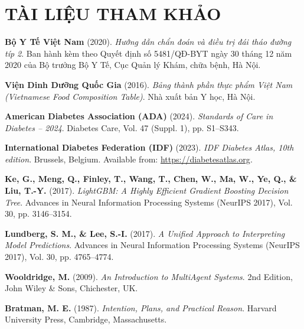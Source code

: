 \documentclass[12pt,a4paper]{article}
\begin{document}
\section*{TÀI LIỆU THAM KHẢO}

\begin{enumerate}[label={[\arabic*]}, leftmargin=1.2cm, itemsep=4pt]
    \item \textbf{Bộ Y Tế Việt Nam} (2020). \textit{Hướng dẫn chẩn đoán và điều trị đái tháo đường típ 2}. Ban hành kèm theo Quyết định số 5481/QĐ-BYT ngày 30 tháng 12 năm 2020 của Bộ trưởng Bộ Y Tế, Cục Quản lý Khám, chữa bệnh, Hà Nội.
    
    \item \textbf{Viện Dinh Dưỡng Quốc Gia} (2016). \textit{Bảng thành phần thực phẩm Việt Nam (Vietnamese Food Composition Table)}. Nhà xuất bản Y học, Hà Nội.
    
    \item \textbf{American Diabetes Association (ADA)} (2024). \textit{Standards of Care in Diabetes -- 2024}. Diabetes Care, Vol. 47 (Suppl. 1), pp. S1--S343.
    
    \item \textbf{International Diabetes Federation (IDF)} (2023). \textit{IDF Diabetes Atlas, 10th edition}. Brussels, Belgium. Available from: \url{https://diabetesatlas.org}.
    
    \item \textbf{Ke, G., Meng, Q., Finley, T., Wang, T., Chen, W., Ma, W., Ye, Q., \& Liu, T.-Y.} (2017). \textit{LightGBM: A Highly Efficient Gradient Boosting Decision Tree}. Advances in Neural Information Processing Systems (NeurIPS 2017), Vol. 30, pp. 3146--3154.
    
    \item \textbf{Lundberg, S. M., \& Lee, S.-I.} (2017). \textit{A Unified Approach to Interpreting Model Predictions}. Advances in Neural Information Processing Systems (NeurIPS 2017), Vol. 30, pp. 4765--4774.
    
    \item \textbf{Wooldridge, M.} (2009). \textit{An Introduction to MultiAgent Systems}. 2nd Edition, John Wiley \& Sons, Chichester, UK.
    
    \item \textbf{Bratman, M. E.} (1987). \textit{Intention, Plans, and Practical Reason}. Harvard University Press, Cambridge, Massachusetts.
    

\end{enumerate}
\end{document}
